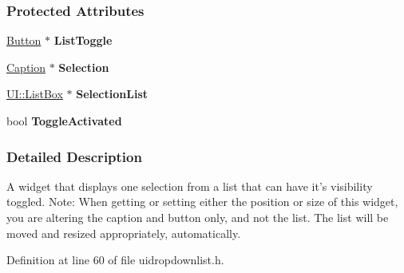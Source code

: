 \subsubsection*{Protected Attributes}
\begin{DoxyCompactItemize}
\item 
\hypertarget{classMezzanine_1_1UI_1_1DropDownList_a0f1e7641c817a41f492ef8e9e87b12c5}{
\hyperlink{classMezzanine_1_1UI_1_1Button}{Button} $\ast$ {\bfseries ListToggle}}
\label{classMezzanine_1_1UI_1_1DropDownList_a0f1e7641c817a41f492ef8e9e87b12c5}

\item 
\hypertarget{classMezzanine_1_1UI_1_1DropDownList_a587c3c13016b3daac433630c5aa33173}{
\hyperlink{classMezzanine_1_1UI_1_1Caption}{Caption} $\ast$ {\bfseries Selection}}
\label{classMezzanine_1_1UI_1_1DropDownList_a587c3c13016b3daac433630c5aa33173}

\item 
\hypertarget{classMezzanine_1_1UI_1_1DropDownList_aa328a078d01876b4b550ef18429278f7}{
\hyperlink{classMezzanine_1_1UI_1_1ListBox}{UI::ListBox} $\ast$ {\bfseries SelectionList}}
\label{classMezzanine_1_1UI_1_1DropDownList_aa328a078d01876b4b550ef18429278f7}

\item 
\hypertarget{classMezzanine_1_1UI_1_1DropDownList_a2580b6fd7c26d4b442c35c6d97602569}{
bool {\bfseries ToggleActivated}}
\label{classMezzanine_1_1UI_1_1DropDownList_a2580b6fd7c26d4b442c35c6d97602569}

\end{DoxyCompactItemize}


\subsubsection{Detailed Description}
A widget that displays one selection from a list that can have it's visibility toggled. Note: When getting or setting either the position or size of this widget, you are altering the caption and button only, and not the list. The list will be moved and resized appropriately, automatically. 

Definition at line 60 of file uidropdownlist.h.




